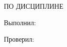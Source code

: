 \begin{ESKDtitlePage}
    \begin{center}
        \gpiMinEdu \\
        \gpiEdu \\
        \gpiKaf \\
    \end{center}

    \vfill

    \begin{center}
        \gpiTopic
    \end{center}

    \vfill

    \begin{center}
        \textbf{\gpiDocTopic} \\
        ПО ДИСЦИПЛИНЕ \gpiDiscipline \\
    \end{center}

    \vfill

    \begin{flushright}
        \begin{minipage}[t]{7cm}
            Выполнил:\\
            \PageTitleStudentInfo
            \PageTitleDateField
            \hspace{0pt}

            Проверил:\\
            \PageTitleTeacherInfo
            \PageTitleDateField
        \end{minipage}
    \end{flushright}

    \vfill

    \begin{center}
        \PageTitleCity~\ESKDtheYear
    \end{center}
\end{ESKDtitlePage}

